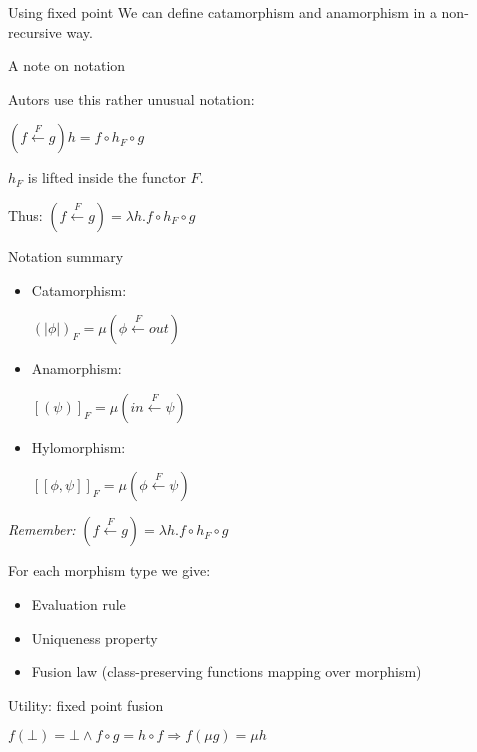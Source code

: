 \documentclass{beamer}
\newcommand{\hin}[2]{}
\begin{document}
\begin{frame}{Using fixed point}
We can define catamorphism and anamorphism in a non-recursive way.

\hin{168}{175}

\end{frame}


\begin{frame}{A note on notation}

Autors use this rather unusual notation:


$(f \xleftarrow{F} g) h = f \circ h_F \circ g$ 

$h_F$ is lifted inside the functor $F$.

Thus: $(f \xleftarrow{F} g)  = \lambda h. f \circ h_F \circ g$ 

\end{frame}


\begin{frame}{Notation summary}

 
 
\begin{itemize}
\item Catamorphism:

$(\!|\phi|\!)_F = \mu(\phi \xleftarrow{F} out)$ 

\hin{171}{171}

\item Anamorphism:

$[\!(\psi)\!]_F = \mu(in \xleftarrow{F} \psi )$ 

\hin{174}{174}

\item Hylomorphism:

$[\![\phi, \psi]\!]_F = \mu(\phi \xleftarrow{F} \psi )$ 
\end{itemize}

\textit{Remember:} $(f \xleftarrow{F} g)  = \lambda h. f \circ h_F \circ g$ 


\end{frame}

\begin{frame}
For each morphism type we give:
\begin{itemize}
\item Evaluation rule
\item Uniqueness property
\item Fusion law (class-preserving functions mapping over morphism)
\end{itemize}
\end{frame}

\begin{frame}{Utility: fixed point fusion}

$f ( \bot ) = \bot \land f \circ g = h \circ f \Rightarrow f (\mu g) = \mu h $

\end{frame}
\end{document}

